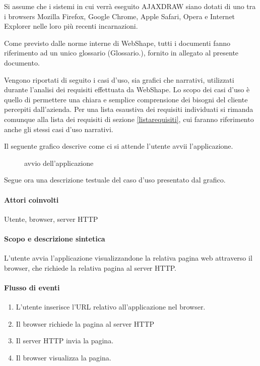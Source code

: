 Si assume che i sistemi in cui verr\`a eseguito AJAXDRAW siano dotati di uno tra i browsers Mozilla Firefox, Google Chrome, Apple Safari, Opera e Internet Explorer nelle loro pi\`u recenti incarnazioni.

Come previsto dalle norme interne di WebShape, tutti i documenti fanno riferimento ad un unico glossario (Glossario.), fornito in allegato al presente documento.

Vengono riportati di seguito i casi d'uso, sia grafici che narrativi, utilizzati durante l'analisi dei requisiti effettuata da WebShape. Lo scopo dei casi d'uso \`e quello di permettere una chiara e semplice comprensione dei bisogni del cliente percepiti dall'azienda. Per una lista esaustiva dei requisiti individuati si rimanda comunque alla lista dei requisiti di sezione \ref{listarequisiti}, cui faranno riferimento anche gli stessi casi d'uso narrativi.

Il seguente grafico descrive come ci si attende l'utente avvii l'applicazione.
\begin{figure}
\centering
\caption{avvio dell'applicazione}
\end{figure}

Segue ora una descrizione testuale del caso d'uso presentato dal grafico.

\paragraph{Attori coinvolti} Utente, browser, server HTTP
\paragraph{Scopo e descrizione sintetica}
L'utente avvia l'applicazione visualizzandone la relativa pagina web attraverso il browser, che richiede la relativa pagina al server HTTP.
\paragraph{Flusso di eventi}
\begin{enumerate}
\item L'utente inserisce l'URL relativo all'applicazione nel browser.
\item Il browser richiede la pagina al server HTTP
\item Il server HTTP invia la pagina.
\item Il browser visualizza la pagina.
\end{enumerate}
